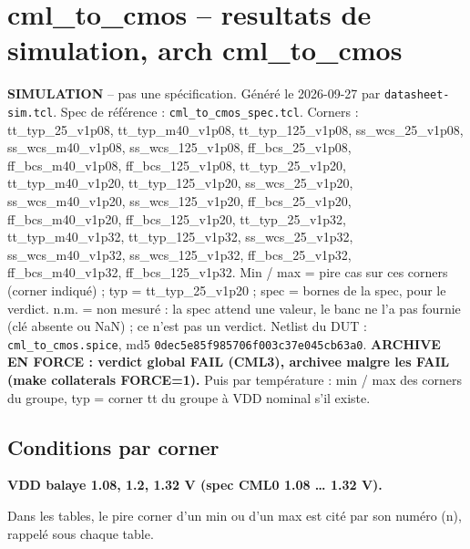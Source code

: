 \documentclass[a4paper,10pt,landscape]{article}
\begin{document}
\section*{cml\_to\_cmos -- resultats de simulation, arch cml\_to\_cmos}
\textbf{SIMULATION} -- pas une sp\'ecification. G\'en\'er\'e le 2026-09-27 par \texttt{datasheet-sim.tcl}.
Spec de r\'ef\'erence : \texttt{cml\_to\_cmos\_spec.tcl}. Corners : tt\_typ\_25\_v1p08, tt\_typ\_m40\_v1p08, tt\_typ\_125\_v1p08, ss\_wcs\_25\_v1p08, ss\_wcs\_m40\_v1p08, ss\_wcs\_125\_v1p08, ff\_bcs\_25\_v1p08, ff\_bcs\_m40\_v1p08, ff\_bcs\_125\_v1p08, tt\_typ\_25\_v1p20, tt\_typ\_m40\_v1p20, tt\_typ\_125\_v1p20, ss\_wcs\_25\_v1p20, ss\_wcs\_m40\_v1p20, ss\_wcs\_125\_v1p20, ff\_bcs\_25\_v1p20, ff\_bcs\_m40\_v1p20, ff\_bcs\_125\_v1p20, tt\_typ\_25\_v1p32, tt\_typ\_m40\_v1p32, tt\_typ\_125\_v1p32, ss\_wcs\_25\_v1p32, ss\_wcs\_m40\_v1p32, ss\_wcs\_125\_v1p32, ff\_bcs\_25\_v1p32, ff\_bcs\_m40\_v1p32, ff\_bcs\_125\_v1p32.
Min / max = pire cas sur ces corners (corner indiqu\'e) ; typ = tt\_typ\_25\_v1p20 ; spec = bornes de la spec, pour le verdict. n.m. = non mesur\'e : la spec attend une valeur, le banc ne l'a pas fournie (cl\'e absente ou NaN) ; ce n'est pas un verdict.
Netlist du DUT : \texttt{cml\_to\_cmos.spice}, md5 \texttt{0dec5e85f985706f003c37e045cb63a0}.
\textbf{ARCHIVE EN FORCE : verdict global FAIL (CML3), archivee malgre les FAIL (make collaterals FORCE=1).}
Puis par temp\'erature : min / max des corners du groupe, typ = corner tt du groupe \`a VDD nominal s'il existe.

\subsection*{Conditions par corner}
\textbf{VDD balaye 1.08, 1.2, 1.32 V (spec CML0 1.08 \ldots{} 1.32 V).}

Dans les tables, le pire corner d'un min ou d'un max est cit\'e par son num\'ero (n), rappel\'e sous chaque table.
\end{document}
